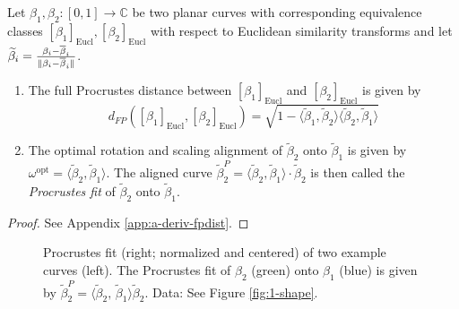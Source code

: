 \begin{lemma}
  \label{lem:2-fpdist}
  Let $\beta_1, \beta_2 : [0,1] \rightarrow \mathbb{C}$ be two planar curves with corresponding equivalence classes $[\beta_1]_\text{Eucl}, [\beta_2]_\text{Eucl}$ with respect to Euclidean similarity transforms and let $\widetilde\beta_i = \frac{\beta_i - \overline\beta_i}{\lVert\beta_i - \overline\beta_i\rVert}$.
  \begin{enumerate}[label=\emph{\roman*.)}]
    \item The full Procrustes distance between $[\beta_1]_\text{Eucl}$ and $[\beta_2]_\text{Eucl}$ is given by 
      \begin{equation}
        d_{FP}([\beta_1]_\text{Eucl},[\beta_2]_\text{Eucl}) = \sqrt{ 1 - \langle \widetilde\beta_1, \widetilde\beta_2 \rangle \langle \widetilde\beta_2, \widetilde\beta_1 \rangle }
      \end{equation}
    \item The optimal rotation and scaling alignment of $\widetilde\beta_2$ onto $\widetilde\beta_1$ is given by $\omega^\text{opt} = \langle \widetilde\beta_2, \widetilde\beta_1 \rangle$. 
      The aligned curve $\widetilde\beta_2^{P} = \langle \widetilde\beta_2, \widetilde\beta_1 \rangle \cdot \widetilde\beta_2$ is then called the \emph{Procrustes fit} of $\widetilde\beta_2$ onto $\widetilde\beta_1$.
  \end{enumerate}
  \begin{proof}
    See Appendix \ref{app:a-deriv-fpdist}.
  \end{proof}
\end{lemma}

\begin{figure}[!hbt]
  \centering
  \begin{subfigure}{.48\textwidth}
    \centering
  \end{subfigure}\hfill%
  \begin{subfigure}{.48\textwidth}
    \centering
  \end{subfigure}
  \caption{
    Procrustes fit (right; normalized and centered) of two example curves (left).
    The Procrustes fit of $\beta_2$ (green) onto $\beta_1$ (blue) is given by $\widetilde\beta_2^P = \langle \widetilde\beta_2,\, \widetilde\beta_1 \rangle \widetilde\beta_2$.
    Data: See Figure \ref{fig:1-shape}.}
  \label{fig:2-pfit}
\end{figure}


